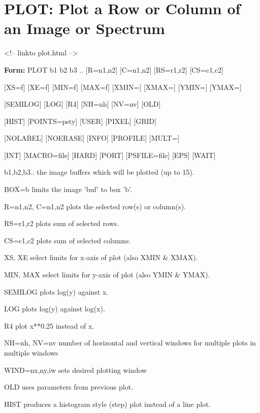 \section{PLOT: Plot a Row or Column of an Image or Spectrum}
\begin{rawhtml}
<!-- linkto plot.html -->
\end{rawhtml}
\begin{command}
  \item[\textbf{Form: } PLOT b1 b2 b3 .. {[R=n1,n2]} {[C=n1,n2]}
       {[RS=r1,r2]} {[CS=c1,c2]}\hfill]{}
  \item{{[XS=f]} {[XE=f]} {[MIN=f]} {[MAX=f]} {[XMIN=]} {[XMAX=]} 
        {[YMIN=]} {[YMAX=]}}
  \item{{[SEMILOG]} {[LOG]} {[R4]} {[NH=nh]} {[NV=nv]} {[OLD]}}
  \item{{[HIST]} {[POINTS=psty]} {[USER]} {[PIXEL]} {[GRID]} }
  \item{{[NOLABEL]} {[NOERASE]} {[INFO]} {[PROFILE]} {[MULT=]} }
  \item{{[INT]} {[MACRO=file]} {[HARD]} {[PORT]} {[PSFILE=file]} {[EPS]} 
       {[WAIT]} }
  \item[b1,b2,b3..]{the image buffers which will be plotted (up to 15).}
  \item[BOX=b]{limits the image 'buf' to box 'b'.}
  \item[R=n1,n2, C=n1,n2]{plots the selected row(s) or column(s).}
  \item[RS=r1,r2]{plots sum of selected rows.}
  \item[CS=c1,c2]{plots sum of selected columns.}
  \item[XS, XE]{select limits for x-axis of plot (also XMIN \& XMAX).}
  \item[MIN, MAX]{select limits for y-axis of plot (also YMIN \& YMAX).}
  \item[SEMILOG]{plots log(y) against x.}
  \item[LOG]{plots log(y) against log(x).}
  \item[R4      ]{plot x**0.25 instead of x.}
  \item[NH=nh, NV=nv ]{number of horizontal and vertical windows
       for multiple plots in multiple windows}
  \item[WIND=nx,ny,iw]{sets desired plotting window}
  \item[OLD]{uses parameters from previous plot.}
  \item[HIST]{produces a histogram style (step) plot instead of a line plot.}

\end{command}
